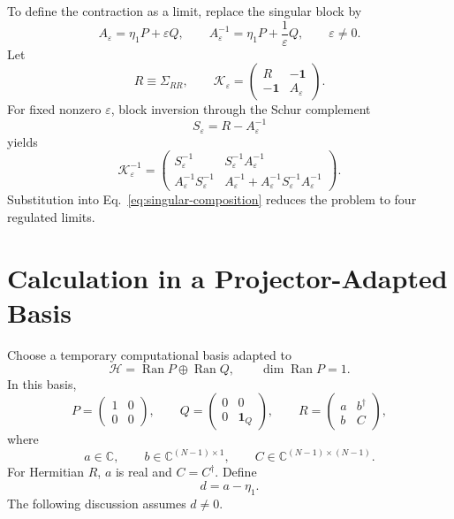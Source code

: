\documentclass[aps,prb,onecolumn,nofootinbib,superscriptaddress]{revtex4-2}
\newcommand{\I}{\mathbf{1}}
\newcommand{\Ran}{\operatorname{Ran}}
\newcommand{\eps}{\varepsilon}
\newcommand{\cH}{\mathcal{H}}
\newcommand{\cK}{\mathcal{K}}
\theoremstyle{plain}
\theoremstyle{definition}
\begin{document}
To define the contraction as a limit, replace the singular block by
\begin{equation}
  A_\eps
  =
  \eta_1P+\eps Q,
  \qquad
  A_\eps^{-1}
  =
  \eta_1P+\frac{1}{\eps}Q,
  \qquad
  \eps\neq0.
  \label{eq:regulator}
\end{equation}
Let
\begin{equation}
  R\equiv \Sigma_{RR},
  \qquad
  \cK_\eps
  =
  \begin{pmatrix}
    R & -\I\\
    -\I & A_\eps
  \end{pmatrix}.
  \label{eq:internal-regulated}
\end{equation}
For fixed nonzero \(\eps\), block inversion through the Schur complement
\begin{equation}
  S_\eps=R-A_\eps^{-1}
  \label{eq:S-eps}
\end{equation}
yields
\begin{equation}
  \cK_\eps^{-1}
  =
  \begin{pmatrix}
  S_\eps^{-1}
  &
  S_\eps^{-1}A_\eps^{-1}
  \\[2pt]
  A_\eps^{-1}S_\eps^{-1}
  &
  A_\eps^{-1}
  +
  A_\eps^{-1}S_\eps^{-1}A_\eps^{-1}
  \end{pmatrix}.
  \label{eq:internal-inverse}
\end{equation}
Substitution into Eq.~\eqref{eq:singular-composition} reduces the problem to
four regulated limits.

\section{Calculation in a Projector-Adapted Basis}

Choose a temporary computational basis adapted to
\begin{equation}
  \cH=\Ran P\oplus\Ran Q,
  \qquad
  \dim\Ran P=1.
  \label{eq:PQ-splitting}
\end{equation}
In this basis,
\begin{equation}
  P=
  \begin{pmatrix}
    1&0\\0&0
  \end{pmatrix},
  \qquad
  Q=
  \begin{pmatrix}
    0&0\\0&\I_Q
  \end{pmatrix},
  \qquad
  R=
  \begin{pmatrix}
    a&b^\dagger\\
    b&C
  \end{pmatrix},
  \label{eq:R-adapted}
\end{equation}
where
\begin{equation}
  a\in\mathbb{C},
  \qquad
  b\in\mathbb{C}^{(N-1)\times 1},
  \qquad
  C\in\mathbb{C}^{(N-1)\times(N-1)}.
  \label{eq:reduced-dimensions}
\end{equation}
For Hermitian \(R\), \(a\) is real and \(C=C^\dagger\).  Define
\begin{equation}
  d=a-\eta_1.
  \label{eq:d-adapted}
\end{equation}
The following discussion assumes \(d\neq0\).
\end{document}
